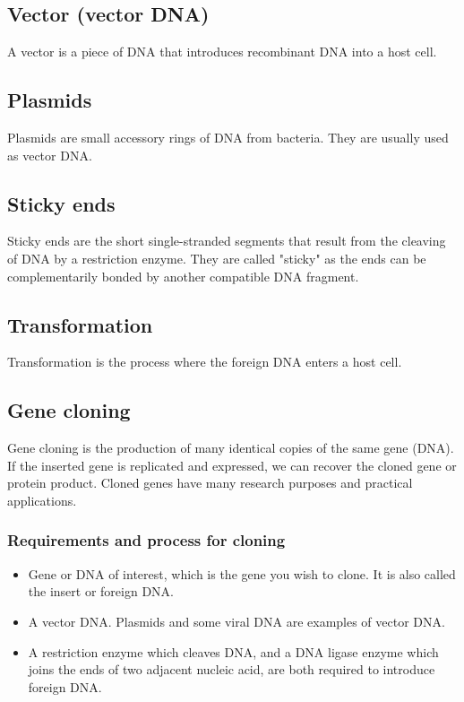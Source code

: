 \documentclass[11pt]{article}
\begin{document}
\subsection{Vector (vector DNA)}
\label{sec:orgbaa88cc}
A vector is a piece of DNA that introduces recombinant DNA into a host cell.

\subsection{Plasmids}
\label{sec:org1941af4}
Plasmids are small accessory rings of DNA from bacteria. They are usually used as vector DNA.

\subsection{Sticky ends}
\label{sec:orgaca0737}
Sticky ends are the short single-stranded segments that result from the cleaving of DNA by a restriction enzyme. They are called "sticky" as the ends can be complementarily bonded by another compatible DNA fragment.

\subsection{Transformation}
\label{sec:orge155184}
Transformation is the process where the foreign DNA enters a host cell.

\newpage

\subsection{Gene cloning}
\label{sec:orgbc806fb}
Gene cloning is the production of many identical copies of the same gene (DNA). If the inserted gene is replicated and expressed, we can recover the cloned gene or protein product. Cloned genes have many research purposes and practical applications.

\subsubsection{Requirements and process for cloning}
\label{sec:org1a0fa1e}
\begin{itemize}
\item Gene or DNA of interest, which is the gene you wish to clone. It is also called the insert or foreign DNA.
\item A vector DNA. Plasmids and some viral DNA are examples of vector DNA.
\item A restriction enzyme which cleaves DNA, and a DNA ligase enzyme which joins the ends of two adjacent nucleic acid, are both required to introduce foreign DNA.
\end{itemize}
\end{document}
